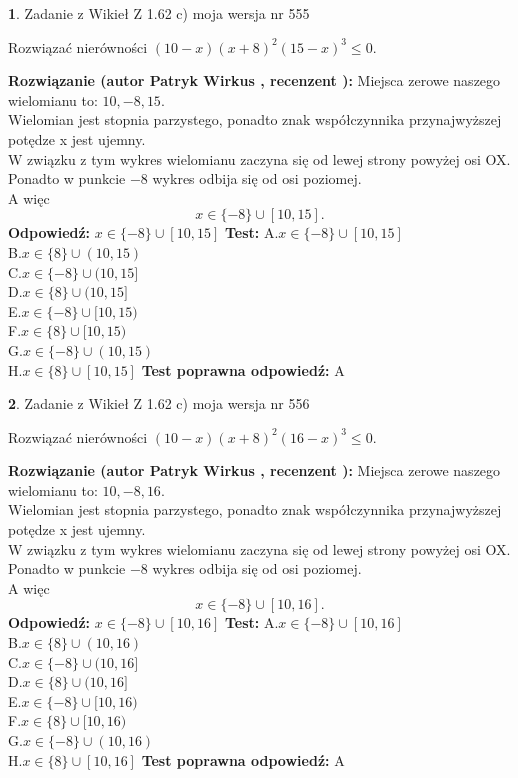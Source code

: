 \documentclass[12pt, a4paper]{article}
\theoremstyle{definition} %
\newtheorem{zad}{}
\newcommand{\zadStart}[1]{\begin{zad}#1\newline}
\newcommand{\zadStop}{\end{zad}}
\newcommand{\rozwStart}[2]{\noindent \textbf{Rozwiązanie (autor #1 , recenzent #2): }\newline}
\newcommand{\rozwStop}{\newline}
\newcommand{\odpStart}{\noindent \textbf{Odpowiedź:}\newline}
\newcommand{\odpStop}{\newline}
\newcommand{\testStart}{\noindent \textbf{Test:}\newline}
\newcommand{\testStop}{\newline}
\newcommand{\kluczStart}{\noindent \textbf{Test poprawna odpowiedź:}\newline}
\newcommand{\kluczStop}{\newline}
\begin{document}
\zadStart{Zadanie z Wikieł Z 1.62 c) moja wersja nr 555}

Rozwiązać nierówności $(10-x)(x+8)^{2}(15-x)^{3}\le0$.
\zadStop
\rozwStart{Patryk Wirkus}{}
Miejsca zerowe naszego wielomianu to: $10, -8, 15$.\\
Wielomian jest stopnia parzystego, ponadto znak współczynnika przy\linebreak najwyższej potędze x jest ujemny.\\ W związku z tym wykres wielomianu zaczyna się od lewej strony powyżej osi OX.\\
Ponadto w punkcie $-8$ wykres odbija się od osi poziomej.\\
A więc $$x \in \{-8\} \cup [10,15].$$
\rozwStop
\odpStart
$x \in \{-8\} \cup [10,15]$
\odpStop
\testStart
A.$x \in \{-8\} \cup [10,15]$\\
B.$x \in \{8\} \cup (10,15)$\\
C.$x \in \{-8\} \cup (10,15]$\\
D.$x \in \{8\} \cup (10,15]$\\
E.$x \in \{-8\} \cup [10,15)$\\
F.$x \in \{8\} \cup [10,15)$\\
G.$x \in \{-8\} \cup (10,15)$\\
H.$x \in \{8\} \cup [10,15]$
\testStop
\kluczStart
A
\kluczStop



\zadStart{Zadanie z Wikieł Z 1.62 c) moja wersja nr 556}

Rozwiązać nierówności $(10-x)(x+8)^{2}(16-x)^{3}\le0$.
\zadStop
\rozwStart{Patryk Wirkus}{}
Miejsca zerowe naszego wielomianu to: $10, -8, 16$.\\
Wielomian jest stopnia parzystego, ponadto znak współczynnika przy\linebreak najwyższej potędze x jest ujemny.\\ W związku z tym wykres wielomianu zaczyna się od lewej strony powyżej osi OX.\\
Ponadto w punkcie $-8$ wykres odbija się od osi poziomej.\\
A więc $$x \in \{-8\} \cup [10,16].$$
\rozwStop
\odpStart
$x \in \{-8\} \cup [10,16]$
\odpStop
\testStart
A.$x \in \{-8\} \cup [10,16]$\\
B.$x \in \{8\} \cup (10,16)$\\
C.$x \in \{-8\} \cup (10,16]$\\
D.$x \in \{8\} \cup (10,16]$\\
E.$x \in \{-8\} \cup [10,16)$\\
F.$x \in \{8\} \cup [10,16)$\\
G.$x \in \{-8\} \cup (10,16)$\\
H.$x \in \{8\} \cup [10,16]$
\testStop
\kluczStart
A
\kluczStop
\end{document}
